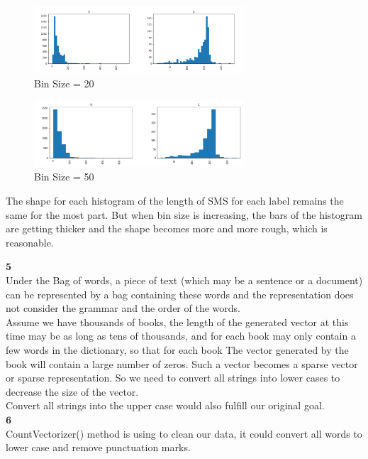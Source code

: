\documentclass[12pt]{article}
\begin{document}
\begin{figure}[H] 
\centering 
\includegraphics[width=0.7\textwidth]{SMS3} 
\caption{Bin Size = 20}
\end{figure}

\begin{figure}[H] 
\centering 
\includegraphics[width=0.7\textwidth]{SMS4} 
\caption{Bin Size = 50}
\end{figure}

The shape for each histogram of the length of SMS for each label remains the same for the most part. But when bin size is increasing, the bars of the histogram are getting thicker and the shape becomes more and more rough, which is reasonable.

$\textbf{5}$\\

Under the Bag of words, a piece of text (which may be a sentence or a document) can be represented by a bag containing these words and the  representation does not consider the grammar and the order of the words. \\

Assume we have thousands of books, the length of the generated vector at this time may be as long as tens of thousands, and for each book may only contain a few words in the dictionary, so that for each book The vector generated by the book will contain a large number of zeros. Such a vector becomes a sparse vector or sparse representation. So we need to convert all strings into lower cases to decrease the size of the vector.\\

Convert all strings into the upper case would also fulfill our original goal.\\

$\textbf{6}$\\

CountVectorizer() method is using to clean our data, it could convert all words to lower case and remove punctuation marks.\\
\end{document}
